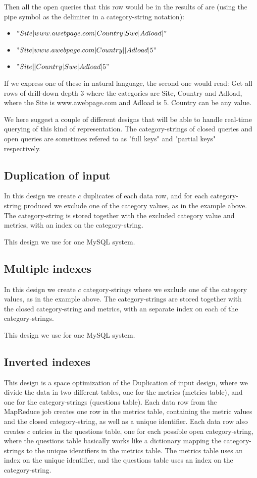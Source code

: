 Then all the open queries that this row would be in the results of are (using the pipe symbol as the delimiter in a category-string notation):
\begin{itemize}
\item $"Site|www.awebpage.com|Country|Swe|Adload|"$
\item $"Site|www.awebpage.com|Country||Adload|5"$
\item $"Site||Country|Swe|Adload|5"$
\end{itemize}

If we express one of these in natural language, the second one would read: Get all rows of drill-down depth 3 where the categories are Site, Country and Adload, where the Site is www.awebpage.com and Adload is 5. Country can be any value.

We here suggest a couple of different designs that will be able to handle real-time querying of this kind of representation. The category-strings of closed queries and open queries are sometimes refered to as "full keys" and "partial keys" respectively. 
\subsection{Duplication of input}
In this design we create $c$ duplicates of each data row, and for each category-string produced we exclude one of the category values, as in the example above. The category-string is stored together with the excluded category value and metrics, with an index on the category-string.

This design we use for one MySQL system.
\subsection{Multiple indexes}
In this design we create $c$ category-strings where we exclude one of the category values, as in the example above. The category-strings are stored together with the closed category-string and metrics, with an separate index on each of the category-strings.

This design we use for one MySQL system.
\subsection{Inverted indexes} \label{subsec:Inverted indexes}
This design is a space optimization of the Duplication of input design, where we divide the data in two different tables, one for the metrics (metrics table), and one for the category-strings (questions table). Each data row from the MapReduce job creates one row in the metrics table, containing the metric values and the closed category-string, as well as a unique identifier. Each data row also creates $c$ entries in the questions table, one for each possible open category-string, where the questions table basically works like a dictionary mapping the category-strings to the unique identifiers in the metrics table. The metrics table uses an index on the unique identifier, and the questions table uses an index on the category-string.

